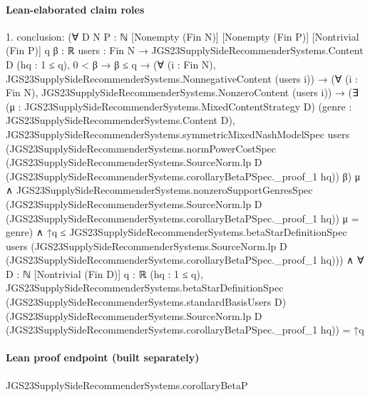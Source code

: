 \documentclass[10pt]{article}
\begin{document}
\paragraph{Lean-elaborated claim roles}\begin{ReviewVerbatim}
1. conclusion: (∀ {D N P : ℕ} [Nonempty (Fin N)] [Nonempty (Fin P)] [Nontrivial (Fin P)] {q β : ℝ}
    {users : Fin N → JGS23SupplySideRecommenderSystems.Content D} (hq : 1 ≤ q),
    0 < β →
      β ≤ q →
        (∀ (i : Fin N), JGS23SupplySideRecommenderSystems.NonnegativeContent (users i)) →
          (∀ (i : Fin N), JGS23SupplySideRecommenderSystems.NonzeroContent (users i)) →
            (∃ (μ : JGS23SupplySideRecommenderSystems.MixedContentStrategy D) (genre :
                JGS23SupplySideRecommenderSystems.Content D),
                JGS23SupplySideRecommenderSystems.symmetricMixedNashModelSpec users
                    (JGS23SupplySideRecommenderSystems.normPowerCostSpec
                      (JGS23SupplySideRecommenderSystems.SourceNorm.lp D
                        (JGS23SupplySideRecommenderSystems.corollaryBetaPSpec._proof_1 hq))
                      β)
                    μ ∧
                  JGS23SupplySideRecommenderSystems.nonzeroSupportGenresSpec
                      (JGS23SupplySideRecommenderSystems.SourceNorm.lp D
                        (JGS23SupplySideRecommenderSystems.corollaryBetaPSpec._proof_1 hq))
                      μ =
                    {genre}) ∧
              ↑q ≤
                JGS23SupplySideRecommenderSystems.betaStarDefinitionSpec users
                  (JGS23SupplySideRecommenderSystems.SourceNorm.lp D
                    (JGS23SupplySideRecommenderSystems.corollaryBetaPSpec._proof_1 hq))) ∧
  ∀ {D : ℕ} [Nontrivial (Fin D)] {q : ℝ} (hq : 1 ≤ q),
    JGS23SupplySideRecommenderSystems.betaStarDefinitionSpec (JGS23SupplySideRecommenderSystems.standardBasisUsers D)
        (JGS23SupplySideRecommenderSystems.SourceNorm.lp D
          (JGS23SupplySideRecommenderSystems.corollaryBetaPSpec._proof_1 hq)) =
      ↑q
\end{ReviewVerbatim}

\paragraph{Lean proof endpoint (built separately)}\begin{ReviewVerbatim}
JGS23SupplySideRecommenderSystems.corollaryBetaP
\end{ReviewVerbatim}
\end{document}
